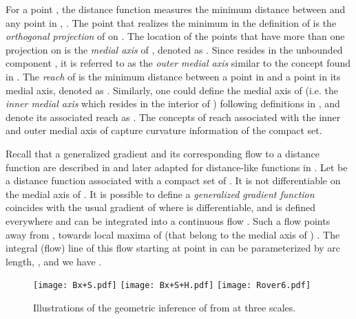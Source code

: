 \documentclass[11pt]{myclass}
\begin{document}
For a point , the distance function  measures the minimum distance between  and any point in , . 
The point  that realizes the minimum in the definition of  is the \emph{orthogonal projection} of  on .  The location of the points  that have more than one projection on  is the \emph{medial axis} of  \cite{Merigot2010}, denoted as . Since  resides in the unbounded component , it is referred to as the \emph{outer medial axis} similar to the concept found in \cite{Dey2007}. The \emph{reach} of  is the minimum distance between a point in  and a point in its medial axis, denoted as . 
Similarly, one could define the medial axis of  (i.e. 
the \emph{inner medial axis} which resides in the interior of ) following definitions in \cite{Lieutier2004}, and denote its associated reach as . The concepts of reach associated with the inner and outer medial axis of  capture curvature information of the compact set. 


Recall that a generalized gradient and its corresponding flow to a distance function are described in \cite{ChazalCohen-SteinerLieutier2009} and later adapted for distance-like functions in \cite{ChazalCohen-SteinerMerigot2011}. 
Let  be a distance function associated with a compact set  of . 
It is not differentiable on the medial axis of . 
It is possible to define a \emph{generalized gradient function}  coincides with the usual gradient of  where  is differentiable, and is defined everywhere and can be integrated into a continuous flow .   
Such a flow points away from , towards local maxima of  (that belong to the medial axis of ) \cite{Merigot2010}. 
The integral (flow) line  of this flow starting at point in  can be parameterized by arc length, , and we have .

\begin{figure}
\texttt{[image: Bx+S.pdf]}
\hspace{.2in}
\texttt{[image: Bx+S+H.pdf]}
\hspace{.2in}
\texttt{[image: Rover6.pdf]}
\caption{\label{fig:inference}
Illustrations of the geometric inference of  from  at three scales.}
\end{figure}
\end{document}
